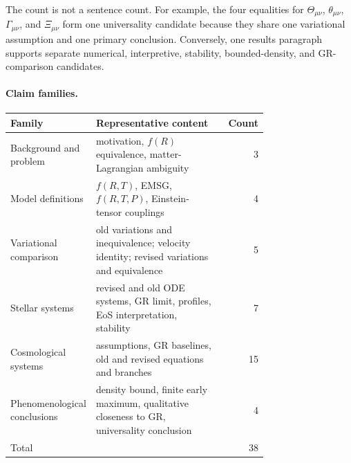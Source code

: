 The count is not a sentence count. For example, the four equalities for $\Theta_{\mu\nu}$, $\theta_{\mu\nu}$, $\Gamma_{\mu\nu}$, and $\Xi_{\mu\nu}$ form one universality candidate because they share one variational assumption and one primary conclusion. Conversely, one results paragraph supports separate numerical, interpretive, stability, bounded-density, and GR-comparison candidates.

\paragraph{Claim families.}
\begin{center}
\begin{tabular}{p{0.25\linewidth}p{0.49\linewidth}r}
\hline
Family & Representative content & Count \\
\hline
Background and problem & motivation, $f(R)$ equivalence, matter-Lagrangian ambiguity & 3 \\
Model definitions & $f(R,T)$, EMSG, $f(R,T,P)$, Einstein-tensor couplings & 4 \\
Variational comparison & old variations and inequivalence; velocity identity; revised variations and equivalence & 5 \\
Stellar systems & revised and old ODE systems, GR limit, profiles, EoS interpretation, stability & 7 \\
Cosmological systems & assumptions, GR baselines, old and revised equations and branches & 15 \\
Phenomenological conclusions & density bound, finite early maximum, qualitative closeness to GR, universality conclusion & 4 \\
\hline
Total & & 38 \\
\hline
\end{tabular}
\end{center}

